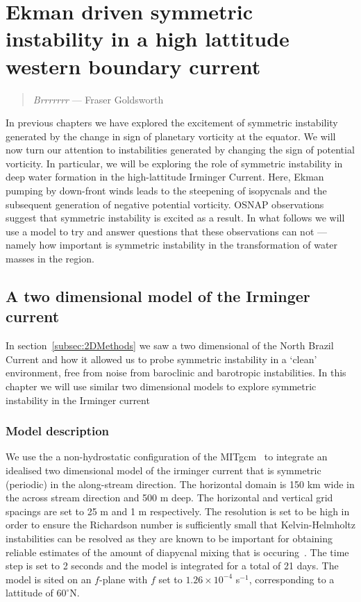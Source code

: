 \chapter{Ekman driven symmetric instability in a high lattitude western boundary current}
\begin{quote}
    \textit{Brrrrrrr} --- Fraser Goldsworth
\end{quote}

In previous chapters we have explored the excitement of symmetric instability generated by the change in sign of planetary vorticity at the equator. We will now turn our attention to instabilities generated by changing the sign of potential vorticity. In particular, we will be exploring the role of symmetric instability in deep water formation in the high-lattitude Irminger Current. Here, Ekman pumping by down-front winds leads to the steepening of isopycnals and the subsequent generation of negative potential vorticity. OSNAP observations suggest that symmetric instability is excited as a result. In what follows we will use a model to try and answer questions that these observations can not --- namely how important is symmetric instability in the transformation of water masses in the region.

\section{A two dimensional model of the Irminger current}
In section~\ref{subsec:2DMethods} we saw a two dimensional of the North Brazil Current and how it allowed us to probe symmetric instability in a `clean' environment, free from noise from baroclinic and barotropic instabilities. In this chapter we will use similar two dimensional models to explore symmetric instability in the Irminger current
\subsection{Model description}
We use the a non-hydrostatic configuration of the MITgcm~\citep{Marshall1997} to integrate an idealised two dimensional model of the irminger current that is symmetric (periodic) in the along-stream direction. The horizontal domain is 150 km wide in the across stream direction and 500 m deep. The horizontal and vertical grid spacings are set to 25 m and 1 m respectively. The resolution is set to be high in order to ensure the Richardson number is sufficiently small that Kelvin-Helmholtz instabilities can be resolved as they are known to be important for obtaining reliable estimates of the amount of diapycnal mixing that is occuring~\citep{Griffiths2003a, Yankovsky2019}. The time step is set to 2 seconds and the model is integrated for a total of 21 days. The model is sited on an $f$-plane with $f$ set to $1.26 \times 10^{-4}$ s$^{-1}$, corresponding to a lattitude of $60^\circ$N. 

